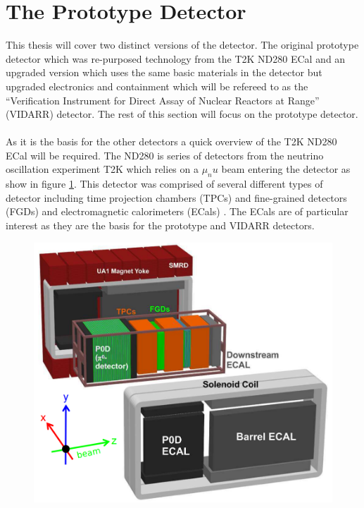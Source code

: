 \documentclass[12pt,a4paper]{article}
\begin{document}
\section{The Prototype Detector}\label{sec_thePrototypeDetector}
This thesis will cover two distinct versions of the detector. The original prototype detector which was re-purposed technology from the T2K ND280 ECal \cite{Allan_2013} and an upgraded version which uses the same basic materials in the detector but upgraded electronics and containment which will be refereed to as the ``Verification Instrument for Direct Assay of Nuclear Reactors at Range'' (VIDARR) detector. The rest of this section will focus on the prototype detector.
\\\\As it is the basis for the other detectors a quick overview of the T2K ND280 ECal will be required. The ND280 is series of detectors from the neutrino oscillation experiment T2K which relies on a $\mu_nu$ beam entering the detector as show in figure \ref{fig_nd280Fig}. This detector was comprised of several different types of detector including time projection chambers (TPCs) and fine-grained detectors (FGDs) and electromagnetic calorimeters (ECals) \cite{Allan_2013}. The ECals are of particular interest as they are the basis for the prototype and VIDARR detectors. 
\begin{figure}[H]
 \centering
 \includegraphics[width=\linewidth/2]{ND280Fig.png} 
 \label{fig_nd280Fig}
\end{figure}
\end{document}
